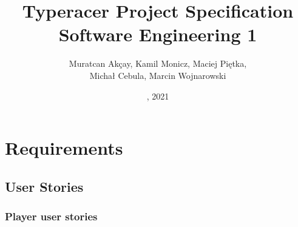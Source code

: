 \documentclass{article}
\title{Typeracer Project Specification \\ \large Software Engineering 1}
\author{Muratcan Akçay, Kamil Monicz, Maciej Piętka,\\ Michał Cebula, Marcin Wojnarowski}
\date{\monthname, 2021}
\begin{document}
\maketitle

\tableofcontents

\section{Requirements}

\subsection{User Stories}

\subsubsection{Player user stories}

\newcommand{\AC}{\subitem AC. }
\end{document}
